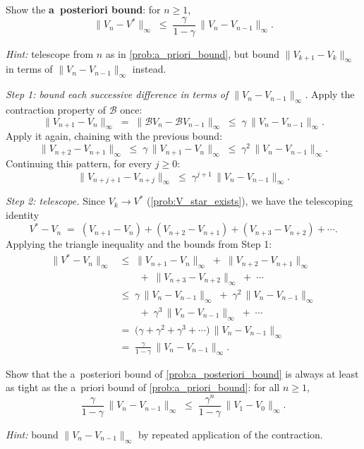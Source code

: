 \documentclass[11pt]{article}
\begin{document}
\begin{exercise}
\label{prob:a_posteriori_bound} Show the \textbf{a~posteriori bound}: for $n \ge 1$,
$$
\|V_n - V^*\|_\infty \;\le\; \frac{\gamma}{1-\gamma}\, \|V_n - V_{n-1}\|_\infty.
$$

\textit{Hint:} telescope from $n$ as in \cref{prob:a_priori_bound}, but bound $\|V_{k+1} - V_k\|_\infty$ in terms of $\|V_n - V_{n-1}\|_\infty$ instead.
\end{exercise}

\begin{solution}
\emph{Step 1: bound each successive difference in terms of $\|V_n - V_{n-1}\|_\infty$.} Apply the contraction property of $\mathcal{B}$ once:
$$
\|V_{n+1} - V_n\|_\infty \;=\; \|\mathcal{B} V_n - \mathcal{B} V_{n-1}\|_\infty \;\le\; \gamma\, \|V_n - V_{n-1}\|_\infty.
$$
Apply it again, chaining with the previous bound:
$$
\|V_{n+2} - V_{n+1}\|_\infty \;\le\; \gamma\, \|V_{n+1} - V_n\|_\infty \;\le\; \gamma^2\, \|V_n - V_{n-1}\|_\infty.
$$
Continuing this pattern, for every $j \ge 0$:
$$
\|V_{n+j+1} - V_{n+j}\|_\infty \;\le\; \gamma^{j+1}\, \|V_n - V_{n-1}\|_\infty.
$$

\emph{Step 2: telescope.} Since $V_k \to V^*$ (\cref{prob:V_star_exists}), we have the telescoping identity
$$
V^* - V_n \;=\; (V_{n+1} - V_n) + (V_{n+2} - V_{n+1}) + (V_{n+3} - V_{n+2}) + \cdots.
$$
Applying the triangle inequality and the bounds from Step 1:
\begin{align*}
\|V^* - V_n\|_\infty
&\le\; \|V_{n+1} - V_n\|_\infty \;+\; \|V_{n+2} - V_{n+1}\|_\infty \\
&\qquad +\; \|V_{n+3} - V_{n+2}\|_\infty \;+\; \cdots \\
&\le\; \gamma\, \|V_n - V_{n-1}\|_\infty \;+\; \gamma^2\, \|V_n - V_{n-1}\|_\infty \\
&\qquad +\; \gamma^3\, \|V_n - V_{n-1}\|_\infty \;+\; \cdots \\
&=\; \bigl(\gamma + \gamma^2 + \gamma^3 + \cdots\bigr)\, \|V_n - V_{n-1}\|_\infty \\
&=\; \frac{\gamma}{1-\gamma}\, \|V_n - V_{n-1}\|_\infty.
\end{align*}
\end{solution}

\begin{exercise}
\label{prob:a_posteriori_tighter} Show that the a~posteriori bound of \cref{prob:a_posteriori_bound} is always at least as tight as the a~priori bound of \cref{prob:a_priori_bound}: for all $n \ge 1$,
$$
\frac{\gamma}{1-\gamma}\, \|V_n - V_{n-1}\|_\infty \;\le\; \frac{\gamma^n}{1-\gamma}\, \|V_1 - V_0\|_\infty.
$$

\textit{Hint:} bound $\|V_n - V_{n-1}\|_\infty$ by repeated application of the contraction.
\end{exercise}
\end{document}
